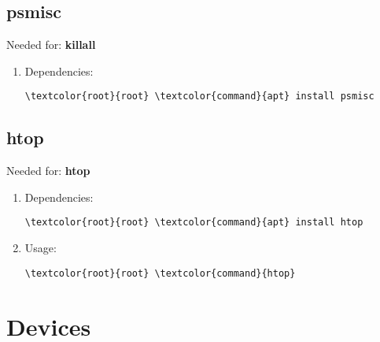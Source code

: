 \documentclass[10pt, a4paper, onecolumn, openany]{book} %
\begin{document}
\subsection{psmisc}
Needed for: \textbf{killall}
\begin{enumerate}
    \item Dependencies:
\begin{Verbatim}[commandchars=\\\{\}]
\textcolor{root}{root} \textcolor{command}{apt} install psmisc
\end{Verbatim}
\end{enumerate}
\subsection{htop}
Needed for: \textbf{htop}
\begin{enumerate}
    \item Dependencies:
\begin{Verbatim}[commandchars=\\\{\}]
\textcolor{root}{root} \textcolor{command}{apt} install htop
\end{Verbatim}
    \item Usage:
\begin{Verbatim}[commandchars=\\\{\}]
\textcolor{root}{root} \textcolor{command}{htop}
\end{Verbatim}
\end{enumerate}
\section{Devices}
\end{document}

